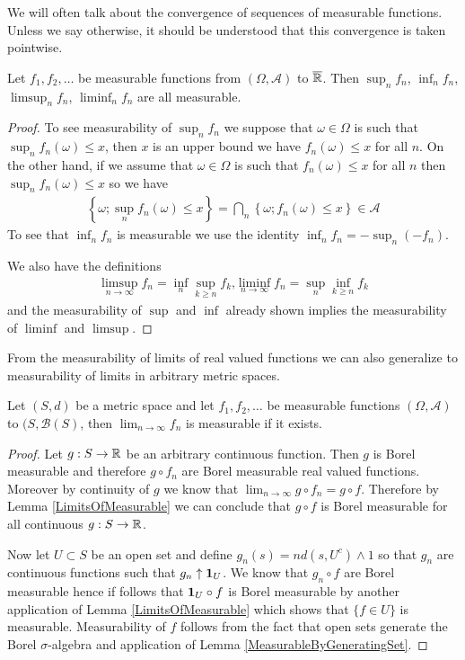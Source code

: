We will often talk about the
convergence of sequences of measurable functions.  Unless we say
otherwise, it should be understood that this convergence is taken pointwise.
\begin{lem}\label{LimitsOfMeasurable}Let $f_1, f_2, \dots$ be measurable functions from
  $(\Omega, \mathcal{A})$ to $\overline{\mathbb{R}}$.  Then $\sup_n f_n$,
  $\inf_n f_n$, $\limsup_n f_n$, $\liminf_n f_n$ are all measurable.
\end{lem}
\begin{proof}
To see measurability of $\sup_n f_n$ we suppose that $\omega \in
\Omega$ is such that $\sup_n f_n(\omega) \leq x$, then $x$ is an upper
bound we have $f_n(\omega) \leq x$ for all $n$.  On the other hand, if
we assume that $\omega \in \Omega$ is such that $f_n(\omega) \leq x$
for all $n$ then  $\sup_n f_n(\omega) \leq x$ so we have
\begin{align*}
\left \{\omega ; \sup_n f_n(\omega) \leq x \right \} = \bigcap_n \left
  \{\omega ; f_n(\omega) \leq x \right \} \in \mathcal{A}
\end{align*}
To see that $\inf_n f_n$ is measurable we use the identity $\inf_n f_n
= -\sup_n (-f_n)$.

We also have the definitions
\begin{align*}
\limsup_{n\to \infty} f_n = \inf_n \sup_{k \geq n} f_k \textrm{,} \liminf_{n\to \infty} f_n = \sup_n \inf_{k \geq n} f_k
\end{align*}
and the measurability of $\sup$ and $\inf$ already shown implies the
measurability of $\liminf$ and $\limsup$.
\end{proof}

From the measurability of limits of real valued functions we can also
generalize to measurability of limits in arbitrary metric spaces.
\begin{lem} \label{LimitsOfMeasurableMetricSpace}Let $(S,d)$ be a metric space and let
  $f_1, f_2, \dotsc$ be
  measurable functions  $(\Omega, \mathcal{A})$ to $(S,
  \mathcal{B}(S)$, then $\lim_{n \to \infty} f_n$ is measurable if it
  exists.
\end{lem}
\begin{proof}
Let $g : S \to \mathbb{R}$ be an arbitrary continuous function.  Then $g$
is Borel measurable and therefore $g \circ f_n$ are Borel measurable
real valued functions.  Moreover by continuity of $g$ we know that
$\lim_{n \to \infty} g \circ f_n  = g \circ f$.  Therefore by Lemma
\ref{LimitsOfMeasurable} we can conclude that $g \circ f$ is Borel
measurable for all continuous $g : S \to \mathbb{R}$.  

Now let $U \subset S$ be an open set and define $g_n(s) = n d(s,U^c)
\wedge 1$ so that $g_n$ are continuous functions such that $g_n
\uparrow \textbf{1}_{U}$.  We know that $g_n \circ f$ are Borel
measurable hence if follows that $\textbf{1}_{U} \circ f$ is Borel
measurable by another application of Lemma
\ref{LimitsOfMeasurable} which shows that $\lbrace f \in U \rbrace$ is
measurable.  Measurability of $f$ follows from the fact that open sets generate the Borel
$\sigma$-algebra and application of Lemma \ref{MeasurableByGeneratingSet}.
\end{proof}

